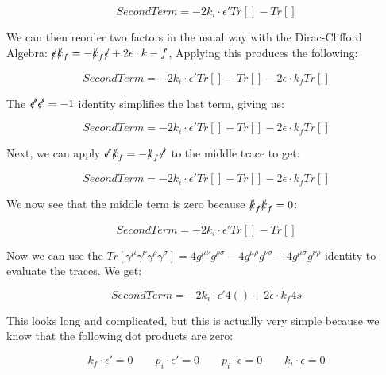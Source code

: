 \documentclass[a4]{article}
\begin{document}
    \begin{equation}
        Second Term = - 2 k_i \cdot \epsilon' Tr [] - Tr []
    \end{equation}

    We can then reorder two factors in the usual way with the Dirac-Clifford Algebra: $\slashed{\epsilon} \slashed{k}_f = - \slashed{k}_f \slashed{\epsilon} + 2 \epsilon \cdot k-f$, Applying this produces the following:

    \begin{equation}
        Second Term = - 2 k_i \cdot \epsilon' Tr [] - Tr [] - 2 \epsilon \cdot k_f Tr []
    \end{equation}

    The $\slashed{\epsilon'} \slashed{\epsilon'} = -1$ identity simplifies the last term, giving us:

    \begin{equation}
        Second Term = - 2 k_i \cdot \epsilon' Tr [] - Tr [] - 2 \epsilon \cdot k_f Tr []
    \end{equation}

    Next, we can apply $\slashed{\epsilon'} \slashed{k}_f = - \slashed{k}_f \slashed{\epsilon'}$ to the middle trace to get:

    \begin{equation}
        Second Term = - 2 k_i \cdot \epsilon' Tr [] - Tr [] - 2 \epsilon \cdot k_f Tr []
    \end{equation}

    We now see that the middle term is zero because $\slashed{k}_f \slashed{k}_f = 0$:

    \begin{equation}
        Second Term = - 2 k_i \cdot \epsilon' Tr [] - Tr []
    \end{equation}

    Now we can use the $Tr [\gamma^\mu \gamma^\nu \gamma^\rho \gamma^\sigma] = 4 g^{\mu \nu} g^{\rho \sigma} - 4 g^{\mu \rho} g^{\nu \sigma} + 4 g^{\mu \sigma} g^{\nu \rho}$ identity to evaluate the traces. We get:

    \begin{equation}
        Second Term = -2 k_i \cdot \epsilon' 4 () + 2 \epsilon \cdot k_f 4s
    \end{equation}

    This looks long and complicated, but this is actually very simple because we know that the following dot products are zero:

    \begin{equation}
        k_f \cdot \epsilon' = 0 \qquad p_i \cdot \epsilon' = 0 \qquad p_i \cdot \epsilon = 0 \qquad k_i \cdot \epsilon = 0
    \end{equation}
\end{document}
